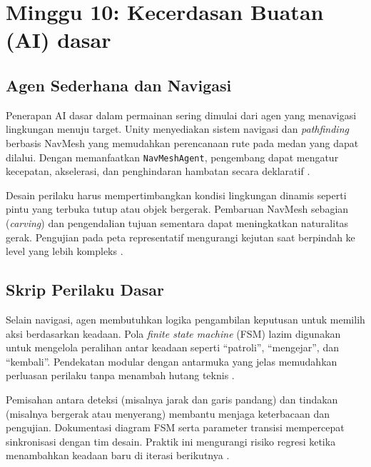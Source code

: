 \documentclass[../main.tex]{subfiles}
\begin{document}
\chapter{Minggu 10: Kecerdasan Buatan (AI) dasar}

\section{Agen Sederhana dan Navigasi}
Penerapan AI dasar dalam permainan sering dimulai dari agen yang menavigasi lingkungan menuju target. Unity menyediakan sistem navigasi dan \textit{pathfinding} berbasis NavMesh yang memudahkan perencanaan rute pada medan yang dapat dilalui. Dengan memanfaatkan \texttt{NavMeshAgent}, pengembang dapat mengatur kecepatan, akselerasi, dan penghindaran hambatan secara deklaratif \parencite{unity-navmesh}.

Desain perilaku harus mempertimbangkan kondisi lingkungan dinamis seperti pintu yang terbuka tutup atau objek bergerak. Pembaruan NavMesh sebagian (\textit{carving}) dan pengendalian tujuan sementara dapat meningkatkan naturalitas gerak. Pengujian pada peta representatif mengurangi kejutan saat berpindah ke level yang lebih kompleks \parencite{unity-navmesh}.

\section{Skrip Perilaku Dasar}
Selain navigasi, agen membutuhkan logika pengambilan keputusan untuk memilih aksi berdasarkan keadaan. Pola \textit{finite state machine} (FSM) lazim digunakan untuk mengelola peralihan antar keadaan seperti \enquote{patroli}, \enquote{mengejar}, dan \enquote{kembali}. Pendekatan modular dengan antarmuka yang jelas memudahkan perluasan perilaku tanpa menambah hutang teknis \parencite{unity-state-machines,gpp-nystrom}.

Pemisahan antara deteksi (misalnya jarak dan garis pandang) dan tindakan (misalnya bergerak atau menyerang) membantu menjaga keterbacaan dan pengujian. Dokumentasi diagram FSM serta parameter transisi mempercepat sinkronisasi dengan tim desain. Praktik ini mengurangi risiko regresi ketika menambahkan keadaan baru di iterasi berikutnya \parencite{gpp-nystrom}.

\onlyinsubfile{\printbibliography}
\end{document}
